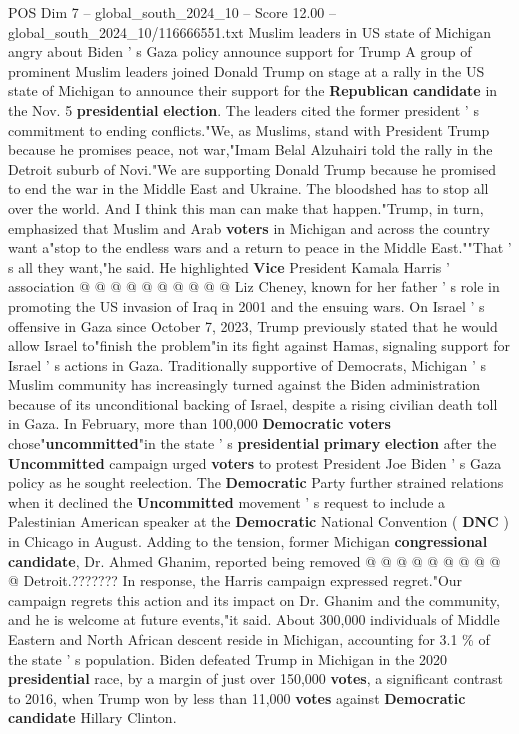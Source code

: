 \begin{textsample}{POS Dim 7 – global\_south\_2024\_10 – Score 12.00 – global\_south\_2024\_10/116666551.txt}  \label{ex:f7_pos_219}
Muslim leaders in US state of Michigan angry about Biden ' s Gaza policy announce support for Trump A group of prominent Muslim leaders joined Donald Trump on stage at a rally in the US state of Michigan to announce their support for the \textbf{Republican} \textbf{candidate} in the Nov. 5 \textbf{presidential} \textbf{election}.
The leaders cited the former president ' s commitment to ending conflicts."We, as Muslims, stand with President Trump because he promises peace, not war,"Imam Belal Alzuhairi told the rally in the Detroit suburb of Novi."We are supporting Donald Trump because he promised to end the war in the Middle East and Ukraine.
The bloodshed has to stop all over the world.
And I think this man can make that happen."Trump, in turn, emphasized that Muslim and Arab \textbf{voters} in Michigan and across the country want a"stop to the endless wars and a return to peace in the Middle East.""That ' s all they want,"he said.
He highlighted \textbf{Vice} President Kamala Harris ' association @ @ @ @ @ @ @ @ @ @ Liz Cheney, known for her father ' s role in promoting the US invasion of Iraq in 2001 and the ensuing wars.
On Israel ' s offensive in Gaza since October 7, 2023, Trump previously stated that he would allow Israel to"finish the problem"in its fight against Hamas, signaling support for Israel ' s actions in Gaza.
Traditionally supportive of Democrats, Michigan ' s Muslim community has increasingly turned against the Biden administration because of its unconditional backing of Israel, despite a rising civilian death toll in Gaza.
In February, more than 100,000 \textbf{Democratic} \textbf{voters} chose"\textbf{uncommitted}"in the state ' s \textbf{presidential} \textbf{primary} \textbf{election} after the \textbf{Uncommitted} campaign urged \textbf{voters} to protest President Joe Biden ' s Gaza policy as he sought reelection.
The \textbf{Democratic} Party further strained relations when it declined the \textbf{Uncommitted} movement ' s request to include a Palestinian American speaker at the \textbf{Democratic} National Convention ( \textbf{DNC} ) in Chicago in August.
Adding to the tension, former Michigan \textbf{congressional} \textbf{candidate}, Dr.
Ahmed Ghanim, reported being removed @ @ @ @ @ @ @ @ @ @ Detroit.???????
In response, the Harris campaign expressed regret."Our campaign regrets this action and its impact on Dr.
Ghanim and the community, and he is welcome at future events,"it said.
About 300,000 individuals of Middle Eastern and North African descent reside in Michigan, accounting for 3.1 \% of the state ' s population.
Biden defeated Trump in Michigan in the 2020 \textbf{presidential} race, by a margin of just over 150,000 \textbf{votes}, a significant contrast to 2016, when Trump won by less than 11,000 \textbf{votes} against \textbf{Democratic} \textbf{candidate} Hillary Clinton.

\end{textsample}
